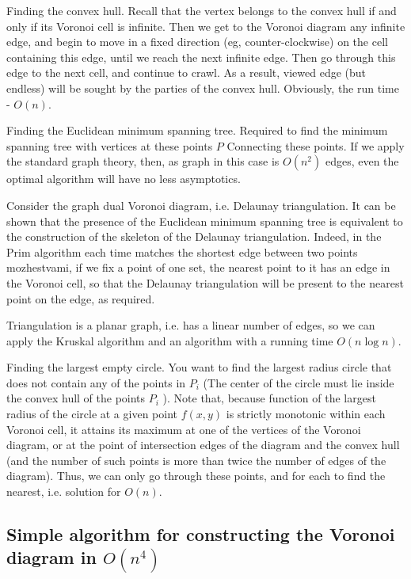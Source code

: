 Finding the convex hull.
Recall that the vertex belongs to the convex hull if and only if its Voronoi cell is infinite. Then we get to the Voronoi diagram any infinite edge, and begin to move in a fixed direction (eg, counter-clockwise) on the cell containing this edge, until we reach the next infinite edge. Then go through this edge to the next cell, and continue to crawl. As a result, viewed edge (but endless) will be sought by the parties of the convex hull. Obviously, the run time - $O (n)$.

Finding the Euclidean minimum spanning tree.
Required to find the minimum spanning tree with vertices at these points $P$ Connecting these points. If we apply the standard graph theory, then, as graph in this case is $O (n ^ 2)$ edges, even the optimal algorithm will have no less asymptotics.

Consider the graph dual Voronoi diagram, i.e. Delaunay triangulation. It can be shown that the presence of the Euclidean minimum spanning tree is equivalent to the construction of the skeleton of the Delaunay triangulation. Indeed, in the Prim algorithm each time matches the shortest edge between two points mozhestvami, if we fix a point of one set, the nearest point to it has an edge in the Voronoi cell, so that the Delaunay triangulation will be present to the nearest point on the edge, as required.

Triangulation is a planar graph, i.e. has a linear number of edges, so we can apply the Kruskal algorithm and an algorithm with a running time $O (n \log n)$.

Finding the largest empty circle.
You want to find the largest radius circle that does not contain any of the points in $P_i$ (The center of the circle must lie inside the convex hull of the points $P_i$ ). Note that, because function of the largest radius of the circle at a given point $f (x, y)$ is strictly monotonic within each Voronoi cell, it attains its maximum at one of the vertices of the Voronoi diagram, or at the point of intersection edges of the diagram and the convex hull (and the number of such points is more than twice the number of edges of the diagram). Thus, we can only go through these points, and for each to find the nearest, i.e. solution for $O (n)$.

\subsection{ Simple algorithm for constructing the Voronoi diagram in $O(n^4)$}

